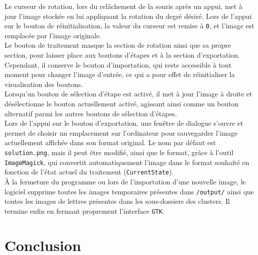 \documentclass{article}
\begin{document}
Le curseur de rotation, lors du relâchement de la souris après un appui, met à jour l'image stockée en lui appliquant la rotation du degré désiré. Lors de l'appui sur le bouton de réinitialisation, la valeur du curseur est remise à \texttt{0}, et l'image est remplacée par l'image originale.\\

Le bouton de traitement masque la section de rotation ainsi que sa propre section, pour laisser place aux boutons d'étapes et à la section d'exportation. Cependant, il conserve le bouton d'importation, qui reste accessible à tout moment pour changer l'image d'entrée, ce qui a pour effet de réinitialiser la visualisation des boutons.\\

Lorsqu'un bouton de sélection d'étape est activé, il met à jour l'image à droite et désélectionne le bouton actuellement activé, agissant ainsi comme un bouton alternatif parmi les autres boutons de sélection d'étapes.\\

Lors de l'appui sur le bouton d'exportation, une fenêtre de dialogue s'ouvre et permet de choisir un emplacement sur l'ordinateur pour sauvegarder l'image actuellement affichée dans son format original. Le nom par défaut est \texttt{solution.png}, mais il peut être modifié, ainsi que le format, grâce à l'outil \texttt{ImageMagick}, qui convertit automatiquement l'image dans le format souhaité en fonction de l'état actuel du traitement (\texttt{CurrentState}).\\

À la fermeture du programme ou lors de l'importation d'une nouvelle image, le logiciel supprime toutes les images temporaires présentes dans \texttt{/output/} ainsi que toutes les images de lettres présentes dans les sous-dossiers des clusters. Il termine enfin en fermant proprement l'interface \texttt{GTK}.\\
\newpage
\section{Conclusion}
\end{document}
